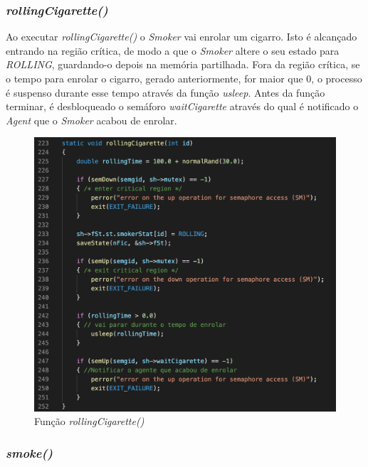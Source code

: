 \documentclass[10pt,portuguese]{article}
\begin{document}
\clearpage

\subsubsection{\textit{rollingCigarette()}}

\par Ao executar \textit{rollingCigarette()} o \textit{Smoker} vai enrolar um cigarro. Isto é alcançado entrando na região crítica, de modo a que o \textit{Smoker} altere o seu estado para \textit{ROLLING}, guardando-o depois na memória partilhada. Fora da região crítica, se o tempo para enrolar o cigarro, gerado anteriormente, for maior que 0, o processo é suspenso durante esse tempo através da função \textit{usleep}. Antes da função terminar, é desbloqueado o semáforo \textit{waitCigarette} através do qual é notificado o \textit{Agent} que o \textit{Smoker} acabou de enrolar.

\begin{figure}[!h]
    \centering
    \includegraphics[width=\textwidth]{images/implementation/rolling.png}
    \caption{Função \textit{rollingCigarette()}}
\end{figure}

\clearpage

\subsubsection{\textit{smoke()}}
\end{document}
